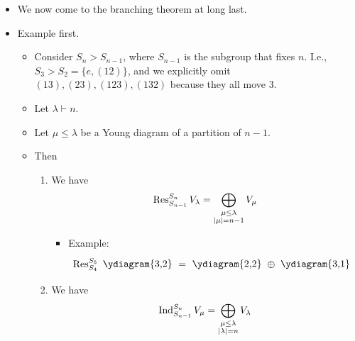 \documentclass[../notes.tex]{subfiles}
\begin{document}
\begin{itemize}
\begin{proof}
\begin{align*}
            &= (\chi_V|_H,\chi_W)_H\\
            &= (\res_H^GV,\chi_W)_H
        \end{align*}
        From line 4 to line 5: Fix $h$; then $g_2g_1g_2^{-1}=h$ iff $g_1=g_2^{-1}hg_2$, so we have overcounted by $|G|$ times. From line 5 to line 6: $\tilde{\chi}_W$ is zero whenever $h^{-1}\notin H$, so this ostensible sum over all $h\in G$ is \emph{de facto} only a sum over all $h\in H$; this is what allows us to consider $\chi_V$ as "restricted to $H$" in line 6.
    \end{proof}
    \item We now come to the branching theorem at long last.
    \item Example first.
    \begin{itemize}
        \item Consider $S_n>S_{n-1}$, where $S_{n-1}$ is the subgroup that fixes $n$. I.e., $S_3>S_2=\{e,(12)\}$, and we explicitly omit $(13),(23),(123),(132)$ because they all move 3.
        \item Let $\lambda\vdash n$.
        \item Let $\mu\leq\lambda$ be a Young diagram of a partition of $n-1$.
        \item Then
        \begin{enumerate}
            \item We have
            \begin{equation*}
                \operatorname{Res}_{S_{n-1}}^{S_n}V_\lambda = \bigoplus_{\substack{\mu\leq\lambda\\|\mu|=n-1}}V_\mu
            \end{equation*}
            \begin{itemize}
                \item Example:
                \begin{equation*}
                    \res_{S_4}^{S_5}\tikz[baseline={(0,-0.1)}]{\node{\ydiagram{3,2}};}
                    = \tikz[baseline={(0,-0.1)}]{\node{\ydiagram{2,2}};}
                    \oplus\tikz[baseline={(0,-0.1)}]{\node{\ydiagram{3,1}};}
                \end{equation*}
            \end{itemize}
            \item We have
            \begin{equation*}
                \operatorname{Ind}_{S_{n-1}}^{S_n}V_\mu = \bigoplus_{\substack{\mu\leq\lambda\\|\lambda|=n}}V_\lambda
            \end{equation*}

\end{enumerate}
\end{itemize}
\end{itemize}
\end{document}
